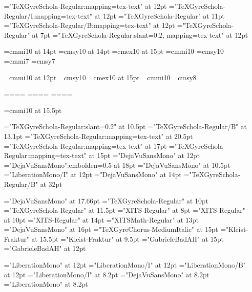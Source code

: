\font\tenrm="TeXGyreSchola-Regular:mapping=tex-text" at 12pt     \font\tenit="TeXGyreSchola-Regular/I:mapping=tex-text" at 12pt
\font\diezrm="TeXGyreSchola-Regular" at 11pt                     \font\tenbf="TeXGyreSchola-Regular/B:mapping=tex-text" at 12pt
\font\fiverm="TeXGyreSchola-Regular" at 7pt                      \font\tensl="TeXGyreSchola-Regular:slant=0.2, mapping=tex-text" at 12pt

\font\teni=cmmi10 at 14pt    \font\tensy=cmsy10 at 14pt    \font\tenex=cmex10 at 15pt
\font\seveni=cmmi10           \font\sevensy=cmsy10
\font\fivei=cmmi7            \font\fivesy=cmsy7

\font\tenipeq=cmmi10 at 12pt    \font\tensypeq=cmsy10    \font\tenex=cmex10 at 15pt
\font\sevenipeq=cmmi10           \font\sevenypeq=cmsy8

=\tenrm              {}=\teni             {}=\tensy             {}=\tenex
{}=\sevenrm          {}=\seveni         {}=\sevensy         {}=\tenex
{}=\fiverm     {}=\fivei    {}=\fivesy    {}=\tenex

\font\mathlista=cmmi10 at 15.5pt

\font\ffoot="TeXGyreSchola-Regular:slant=0.2" at 10.5pt
\font\fnumpag="TeXGyreSchola-Regular/B" at 13.1pt
\font\fencp="TeXGyreSchola-Regular:mapping=tex-text" at 20.5pt
\font\fencs="TeXGyreSchola-Regular:mapping=tex-text" at 17pt
\font\fenct="TeXGyreSchola-Regular:mapping=tex-text" at 15pt
\font\fcode="DejaVuSansMono" at 12pt
\font\fc="DejaVuSansMono":embolden=0.5 at 18pt
\font\fcfoot="DejaVuSansMono" at 10.5pt
\font\fcodenoterm="LiberationMono/I" at 12pt
\font\fcodej="DejaVuSansMono" at 14pt
\font\ftextoappendix="TeXGyreSchola-Regular/B" at 32pt

\font\festrella="DejaVuSansMono" at 17.66pt
\font\fpies="TeXGyreSchola-Regular" at 10pt
\font\fitems="TeXGyreSchola-Regular" at 11.5pt
\font\fsimbs="XITS-Regular" at 8pt
\font{}="XITS-Regular" at 10pt
\font\fsimbols="XITS-Regular" at 14pt
\font\fmats="XITSMath-Regular" at 13pt
\font\fflecha="DejaVuSansMono" at 16pt
\font\machine="TeXGyreChorus-MediumItalic" at 15pt
\font\ffraktur="Kleist-Fraktur" at 15.5pt
\font\ffraktursub="Kleist-Fraktur" at 9.5pt
\font\fgabriele="GabrieleBadAH" at 15pt
\font\fgabrielen="GabrieleBadAH" at 12pt


\font\fgramat="LiberationMono" at 12pt
\font\fgramatnoterm="LiberationMono/I" at 12pt
\font\fgramatterm="LiberationMono/B" at 12pt
\font\fsupnoterm="LiberationMono/I" at 8.2pt
\font\fsup="DejaVuSansMono" at 8.2pt
\font\fgramatsup="LiberationMono" at 8.2pt

